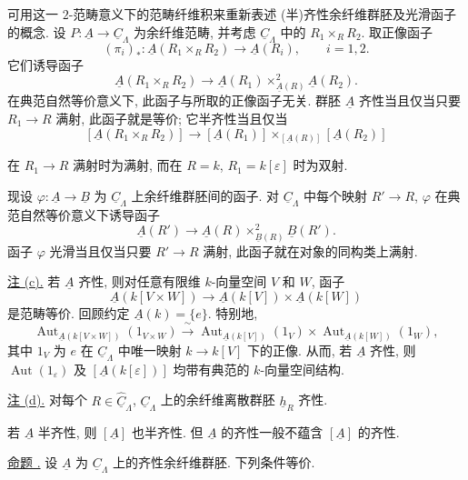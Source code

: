 可用这一 $2$-范畴意义下的范畴纤维积来重新表述
(半)齐性余纤维群胚及光滑函子的概念.
设 $P:\underline A\longrightarrow\underline C_\Lambda$ 为余纤维范畴,
并考虑 $\underline C_\Lambda$ 中的 $R_1\times_RR_2$.
取正像函子
\[
 (\pi_i)_*:\underline A(R_1\times_RR_2)
 \longrightarrow\underline A(R_i),\qquad i=1,2.
\]
它们诱导函子
\[
 \underline A(R_1\times_RR_2)\longrightarrow
 \underline A(R_1)\times^2_{\underline A(R)}\underline A(R_2).
\]
在典范自然等价意义下, 此函子与所取的正像函子无关.
群胚 $\underline A$ 齐性当且仅当只要 $R_1\longrightarrow R$ 满射,
此函子就是等价; 它半齐性当且仅当
\[
 [\underline A(R_1\times_RR_2)]\longrightarrow
 [\underline A(R_1)]
 \times_{[\underline A(R)]}[\underline A(R_2)]
\]


在 $R_1\longrightarrow R$ 满射时为满射,
而在 $R=k$, $R_1=k[\varepsilon]$ 时为双射.

现设 $\varphi:\underline A\longrightarrow\underline B$
为 $\underline C_\Lambda$ 上余纤维群胚间的函子.
对 $\underline C_\Lambda$ 中每个映射 $R'\longrightarrow R$,
$\varphi$ 在典范自然等价意义下诱导函子
\[
 \underline A(R')\longrightarrow
 \underline A(R)\times^2_{\underline B(R)}\underline B(R').
\]
函子 $\varphi$ 光滑当且仅当只要 $R'\longrightarrow R$ 满射,
此函子就在对象的同构类上满射.

\underline{注 (c).}
若 $\underline A$ 齐性, 则对任意有限维 $k$-向量空间 $V$ 和 $W$, 函子
\[
 \underline A(k[V\times W])\longrightarrow
 \underline A(k[V])\times\underline A(k[W])
\]
是范畴等价. 回顾约定 $\underline A(k)=\{e\}$. 特别地,
\[
 \operatorname{Aut}_{\underline A(k[V\times W])}(1_{V\times W})
 \xrightarrow{\ \sim\ }
 \operatorname{Aut}_{\underline A(k[V])}(1_V)
 \times
 \operatorname{Aut}_{\underline A(k[W])}(1_W),
\]
其中 $1_V$ 为 $e$ 在 $\underline C_\Lambda$ 中唯一映射
$k\longrightarrow k[V]$ 下的正像.
从而, 若 $\underline A$ 齐性, 则 $\operatorname{Aut}(1_\varepsilon)$ 及
$[\underline A(k[\varepsilon])]$ 均带有典范的 $k$-向量空间结构.

\underline{注 (d).}
对每个 $R\in\widehat{\underline C}_\Lambda$,
$\underline C_\Lambda$ 上的余纤维离散群胚 $\underline h_R$ 齐性.

若 $\underline A$ 半齐性, 则 $[\underline A]$ 也半齐性.
但 $\underline A$ 的齐性一般不蕴含 $[\underline A]$ 的齐性.

\underline{命题 .}
设 $\underline A$ 为 $\underline C_\Lambda$ 上的齐性余纤维群胚.
下列条件等价.

